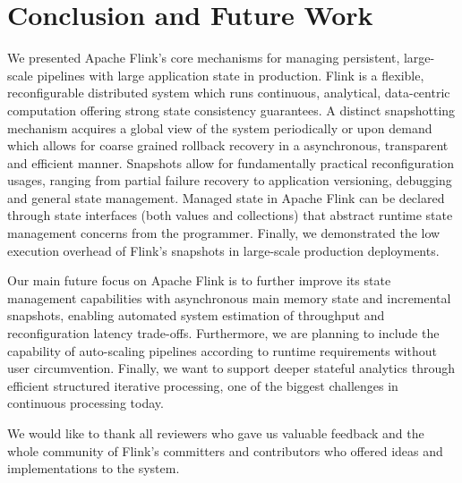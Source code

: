 
\section{Conclusion and Future Work}
\label{sec:conclusion}

We presented Apache Flink's core mechanisms for managing persistent, large-scale pipelines with large application state in production. Flink is a flexible, reconfigurable distributed system which runs continuous, analytical, data-centric computation offering strong state consistency guarantees. A distinct snapshotting mechanism acquires a global view of the system periodically or upon demand which allows for coarse grained rollback recovery in a asynchronous, transparent and efficient manner. Snapshots allow for fundamentally practical reconfiguration usages, ranging from partial failure recovery to application versioning, debugging and general state management. Managed state in Apache Flink can be declared through state interfaces (both values and collections) that abstract runtime state management concerns from the programmer. Finally, we demonstrated the low execution overhead of Flink's snapshots in large-scale production deployments.

\vspace{-1mm}
 Our main future focus on Apache Flink is to further improve its state management capabilities with asynchronous main memory state and incremental snapshots, enabling automated system estimation of throughput and reconfiguration latency trade-offs. Furthermore, we are planning to include the capability of auto-scaling pipelines according to runtime requirements without user circumvention.  Finally, we want to support deeper stateful analytics through efficient structured iterative processing, one of the biggest challenges in continuous processing today. 

\vspace{-1mm}
 We would like to thank all reviewers who gave us valuable feedback and the whole community of Flink's committers and contributors who offered ideas and implementations to the system. 